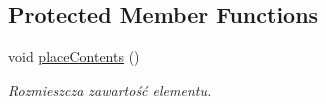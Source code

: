 \subsection*{Protected Member Functions}
\begin{DoxyCompactItemize}
\item 
\hypertarget{class_tree_view_element_a41f61e290696e0f7e6d5b49c1946c2f4}{
void \hyperlink{class_tree_view_element_a41f61e290696e0f7e6d5b49c1946c2f4}{placeContents} ()}
\label{class_tree_view_element_a41f61e290696e0f7e6d5b49c1946c2f4}

\begin{DoxyCompactList}\small\item\em Rozmieszcza zawartość elementu. \item\end{DoxyCompactList}\end{DoxyCompactItemize}
